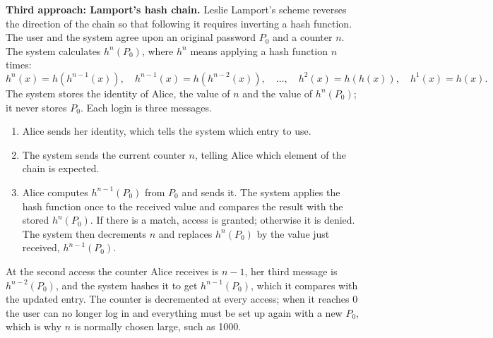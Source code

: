 \textbf{Third approach: Lamport's hash chain.} Leslie Lamport's scheme reverses the direction of the chain so that following it requires inverting a hash function. The user and the system agree upon an original password $P_0$ and a counter $n$. The system calculates $h^n(P_0)$, where $h^n$ means applying a hash function $n$ times:
\[
h^n(x) = h(h^{n-1}(x)), \quad h^{n-1}(x) = h(h^{n-2}(x)), \quad \dots, \quad h^2(x) = h(h(x)), \quad h^1(x) = h(x).
\]
The system stores the identity of Alice, the value of $n$ and the value of $h^n(P_0)$; it never stores $P_0$. Each login is three messages.
\begin{center}
\end{center}
\begin{enumerate}
  \item Alice sends her identity, which tells the system which entry to use.
  \item The system sends the current counter $n$, telling Alice which element of the chain is expected.
  \item Alice computes $h^{n-1}(P_0)$ from $P_0$ and sends it. The system applies the hash function once to the received value and compares the result with the stored $h^n(P_0)$. If there is a match, access is granted; otherwise it is denied. The system then decrements $n$ and replaces $h^n(P_0)$ by the value just received, $h^{n-1}(P_0)$.
\end{enumerate}
At the second access the counter Alice receives is $n - 1$, her third message is $h^{n-2}(P_0)$, and the system hashes it to get $h^{n-1}(P_0)$, which it compares with the updated entry. The counter is decremented at every access; when it reaches 0 the user can no longer log in and everything must be set up again with a new $P_0$, which is why $n$ is normally chosen large, such as 1000.

